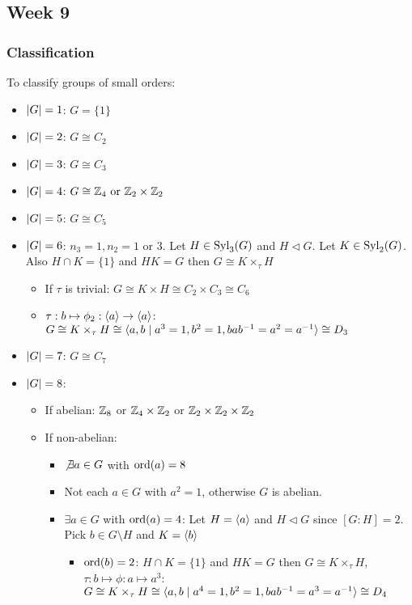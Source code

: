 \subsection{Week 9}
\subsubsection{Classification}

To classify groups of small orders: 
\begin{itemize}
  \item $\lvert G\rvert = 1$: $G = \{1\}$
  \item $\lvert G\rvert = 2$: $G \cong C_2$
  \item $\lvert G\rvert = 3$: $G \cong C_3$
  \item $\lvert G\rvert = 4$: $G \cong \mathbb{Z}_4 \text{~or~} \mathbb{Z}_2 \times \mathbb{Z}_2$
  \item $\lvert G\rvert = 5$: $G \cong C_5$
  \item $\lvert G\rvert = 6$: $n_3 = 1, n_2 = 1 \text{~or~} 3$. Let $H \in \operatorname{Syl}_3(G)$ and $H \lhd G$. Let $K \in \operatorname{Syl}_2(G)$. Also $H \cap K = \{1\}$ and $HK = G$ then $G \cong K \times_{\tau} H$
    \begin{itemize}
      \item If $\tau$ is trivial: $G \cong K \times H \cong C_2 \times C_3 \cong C_6$
      \item $\tau: b \mapsto \phi_2: \langle a\rangle \to \langle a\rangle$: $G \cong K \times_{\tau} H \cong \langle a,b \mid a^3 = 1, b^2 = 1, bab^{-1} = a^2 = a^{-1}\rangle \cong D_3$
    \end{itemize}
  \item $\lvert G\rvert = 7$: $G \cong C_7$
  \item $\lvert G\rvert = 8$:
    \begin{itemize}
      \item If abelian: $\mathbb{Z}_8$ or $\mathbb{Z}_4 \times \mathbb{Z}_2$ or $\mathbb{Z}_2 \times \mathbb{Z}_2 \times \mathbb{Z}_2$
      \item If non-abelian:
        \begin{itemize}
          \item $\not\exists a \in G$ with $\operatorname{ord}(a) = 8$
          \item Not each $a \in G$ with $a^2 = 1$, otherwise $G$ is abelian.
          \item $\exists a \in G$ with $\operatorname{ord}(a) = 4$: Let $H = \langle a\rangle$ and $H \lhd G$ since $[G:H] = 2$. Pick $b \in G \setminus H$ and $K = \langle b\rangle$
            \begin{itemize}
              \item $\operatorname{ord}(b) = 2$: $H \cap K = \{1\}$ and $HK = G$ then $G \cong K \times_{\tau} H$, $\tau: b \mapsto \phi: a \mapsto a^3$: $G \cong K \times_{\tau} H \cong \langle a,b \mid a^4 = 1, b^2 = 1, bab^{-1} = a^3 = a^{-1}\rangle \cong D_4$

\end{itemize}
\end{itemize}
\end{itemize}
\end{itemize}
